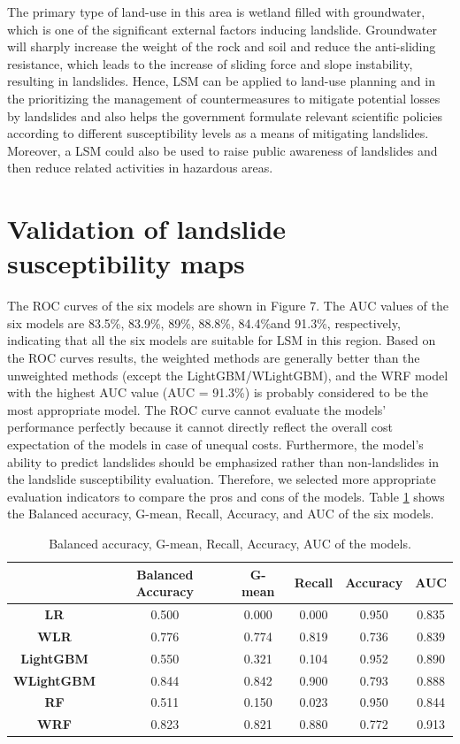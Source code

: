 \documentclass[a4paper,fleqn]{cas-sc}
\begin{document}
The primary type of land-use in this area is wetland filled with groundwater, which is one of the significant external factors inducing landslide. 
Groundwater will sharply increase the weight of the rock and soil and reduce the anti-sliding resistance, which leads to the increase of sliding force and slope instability, resulting in landslides. 
Hence, LSM can be applied to land-use planning and in the prioritizing the management of countermeasures to mitigate potential losses by landslides and also helps the government formulate relevant scientific policies according to different susceptibility levels as a means of mitigating landslides. 
Moreover, a LSM could also be used to raise public awareness of landslides and then reduce related activities in hazardous areas.

\section{Validation of landslide susceptibility maps}

The ROC curves of the six models are shown in Figure 7. 
The AUC values of the six models are 83.5\%, 83.9\%, 89\%, 88.8\%, 84.4\%and 91.3\%, respectively, indicating that all the six models are suitable for LSM in this region. 
Based on the ROC curves results, the weighted methods are generally better than the unweighted methods (except the LightGBM/WLightGBM), and the WRF model with the highest AUC value (AUC = 91.3\%) is probably considered to be the most appropriate model.
The ROC curve cannot evaluate the models' performance perfectly because it cannot directly reflect the overall cost expectation of the models in case of unequal costs. 
Furthermore, the model's ability to predict landslides should be emphasized rather than non-landslides in the landslide susceptibility evaluation. 
Therefore, we selected more appropriate evaluation indicators to compare the pros and cons of the models. 
Table \ref{tab_evaluate} shows the Balanced accuracy, G-mean, Recall, Accuracy, and AUC of the six models. 

\begin{table}
  \centering
  \caption{Balanced accuracy, G-mean, Recall, Accuracy, AUC of the models.}
    \begin{tabular}{cccccc}
    \toprule
          & \textbf{Balanced Accuracy} & \textbf{G-mean} & \textbf{Recall} & \textbf{Accuracy} & \textbf{AUC} \\
    \midrule
    \textbf{LR} & 0.500  & 0.000  & 0.000  & 0.950  & 0.835  \\
    \textbf{WLR} & 0.776  & 0.774  & 0.819  & 0.736  & 0.839  \\
    \textbf{LightGBM} & 0.550  & 0.321  & 0.104  & 0.952  & 0.890  \\
    \textbf{WLightGBM} & 0.844  & 0.842  & 0.900  & 0.793  & 0.888  \\
    \textbf{RF} & 0.511  & 0.150  & 0.023  & 0.950  & 0.844  \\
    \textbf{WRF} & 0.823  & 0.821  & 0.880  & 0.772  & 0.913  \\
    \bottomrule
    \end{tabular}%
  \label{tab_evaluate}%
\end{table}%
\end{document}
